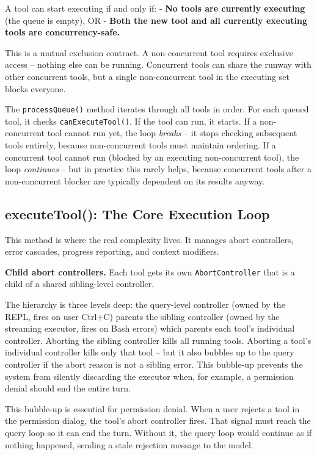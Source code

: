 \documentclass[
  english,
  11pt,
  letterpaper,
]{book}
\begin{document}
A tool can start executing if and only if: - \textbf{No tools are
currently executing} (the queue is empty), OR - \textbf{Both the new
tool and all currently executing tools are concurrency-safe.}

This is a mutual exclusion contract. A non-concurrent tool requires
exclusive access -- nothing else can be running. Concurrent tools can
share the runway with other concurrent tools, but a single
non-concurrent tool in the executing set blocks everyone.

The \texttt{processQueue()} method iterates through all tools in order.
For each queued tool, it checks \texttt{canExecuteTool()}. If the tool
can run, it starts. If a non-concurrent tool cannot run yet, the loop
\emph{breaks} -- it stops checking subsequent tools entirely, because
non-concurrent tools must maintain ordering. If a concurrent tool cannot
run (blocked by an executing non-concurrent tool), the loop
\emph{continues} -- but in practice this rarely helps, because
concurrent tools after a non-concurrent blocker are typically dependent
on its results anyway.

\subsection{executeTool(): The Core Execution
Loop}\label{executetool-the-core-execution-loop}

This method is where the real complexity lives. It manages abort
controllers, error cascades, progress reporting, and context modifiers.

\textbf{Child abort controllers.} Each tool gets its own
\texttt{AbortController} that is a child of a shared sibling-level
controller.

The hierarchy is three levels deep: the query-level controller (owned by
the REPL, fires on user Ctrl+C) parents the sibling controller (owned by
the streaming executor, fires on Bash errors) which parents each tool's
individual controller. Aborting the sibling controller kills all running
tools. Aborting a tool's individual controller kills only that tool --
but it also bubbles up to the query controller if the abort reason is
not a sibling error. This bubble-up prevents the system from silently
discarding the executor when, for example, a permission denial should
end the entire turn.

This bubble-up is essential for permission denial. When a user rejects a
tool in the permission dialog, the tool's abort controller fires. That
signal must reach the query loop so it can end the turn. Without it, the
query loop would continue as if nothing happened, sending a stale
rejection message to the model.
\end{document}
